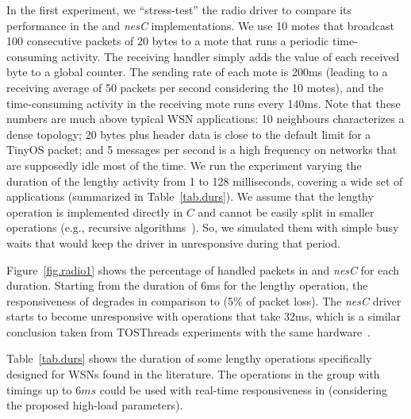 In the first experiment, we ``stress-test'' the radio driver to compare its 
performance in the \CEU and \emph{nesC} implementations.
We use 10 motes that broadcast 100 consecutive packets of 20 bytes to a mote 
that runs a periodic time-consuming activity.
The receiving handler simply adds the value of each received byte to a global 
counter.
%
The sending rate of each mote is 200ms (leading to a receiving average of 50 
packets per second considering the 10 motes), and the time-consuming activity 
in the receiving mote runs every 140ms.
%
Note that these numbers are much above typical WSN applications: 10 neighbours 
characterizes a dense topology; 20 bytes plus header data is close to the 
default limit for a TinyOS packet; and 5 messages per second is a high 
frequency on networks that are supposedly idle most of the time.
%
We run the experiment varying the duration of the lengthy activity from 1 to 
128 milliseconds, covering a wide set of applications (summarized in 
Table~\ref{tab.durs}).
%
We assume that the lengthy operation is implemented directly in $C$ and cannot 
be easily split in smaller operations (e.g., recursive 
algorithms~\cite{wsn.comparison,wsn.tosthreads}).
So, we simulated them with simple busy waits that would keep the driver in \CEU 
unresponsive during that period.

Figure~\ref{fig.radio1} shows the percentage of handled packets in \CEU and 
\emph{nesC} for each duration.
%
Starting from the duration of 6ms for the lengthy operation, the responsiveness 
of \CEU degrades in comparison to \nesc (5\% of packet loss).
%
The \emph{nesC} driver starts to become unresponsive with operations that take 
32ms, which is a similar conclusion taken from TOSThreads experiments with the 
same hardware~\cite{wsn.tosthreads}.
%

%
Table~\ref{tab.durs} shows the duration of some lengthy operations specifically 
designed for WSNs found in the literature.
The operations in the group with timings up to $6ms$ could be used with 
real-time responsiveness in \CEU (considering the proposed high-load 
parameters).

